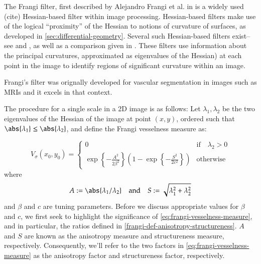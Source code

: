     The Frangi filter, first described by Alejandro Frangi et al. in \cite{frangi-paper} is a widely used (cite) Hessian-based filter
    within image processing. Hessian-based filters make use of the
    logical ``proximity'' of the Hessian to notions of curvature of surfaces,
    as developed in \cref{sec:differential-geometry}. 
    Several such Hessian-based filters exist--see \cite{sato-filter} and \cite{lorenz-filter}, as well as a comparison given in \cite{olabarriaga-hessian-comparison}. These filters use information about the principal curvatures, approximated as eigenvalues of the Hessian) at each point in the image
    to identify regions of significant curvature within an image.
 
    
    Frangi's filter was orignally developed for vascular segmentation in images such as MRIs and it excels in that context.
    
    The procedure for a single scale in a 2D image is as follows:
    Let $\lambda_1, \lambda_2$ be the two eigenvalues of the Hessian of the image at point $(x, y)$,
    ordered such that $\abs{\lambda_1} \leq \abs{\lambda_2}$, and define the Frangi vesselness measure %
    as:
    
    \begin{equation} \label{eq:frangi-vesselness-measure}
    V_\sigma(x_0,y_0) = \begin{cases}
    0 & \text{if} \quad \lambda_2 > 0 \\
    \exp\left\{-\frac{A^2}{2\beta^2}\right\}
    \left(1 - \exp\left\{-\frac{S^2}{2c^2}\right\}\right) & \text{otherwise}
    \end{cases} \end{equation}
    where
    \begin{equation} \label{frangi-def-anisotropy-structureness}
    A := \abs{\lambda_1 / \lambda_2}
    \quad \textrm{and} \quad 
    S := \sqrt{\lambda_1^2 + \lambda_2^2}
    \end{equation}
    and $\beta$ and $c$ are tuning parameters. Before we discuss appropriate values for $\beta$ and $c$, we first seek to highlight the significance of \cref{eq:frangi-vesselness-measure}, and in particular, the ratios defined in
    \cref{frangi-def-anisotropy-structureness}. $A$ and $S$ are known as the anisotropy measure and structureness measure, respectively. Consequently, we'll refer to the two factors in \cref{eq:frangi-vesselness-measure} as the anisotropy factor and structureness factor, respectively. 
    
